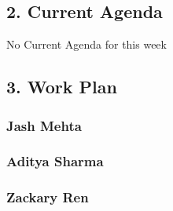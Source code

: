 \documentclass[11pt, oneside]{article}   	%
\begin{document}
\setlength{\headsep}{25pt}
\subsection*{2. Current Agenda}

No Current Agenda for this week

\newpage{}

\setlength{\headsep}{25pt}
\subsection*{3. Work Plan}
\subsubsection*{Jash Mehta}

\subsubsection*{Aditya Sharma}

\subsubsection*{Zackary Ren}
\end{document}
